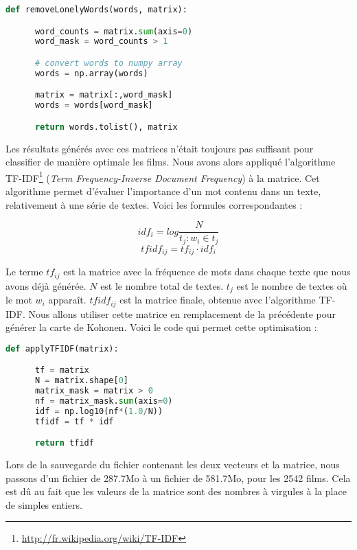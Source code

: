 \begin{lstlisting}[language=python]
  def removeLonelyWords(words, matrix):

      word_counts = matrix.sum(axis=0)
      word_mask = word_counts > 1

      # convert words to numpy array
      words = np.array(words)

      matrix = matrix[:,word_mask]
      words = words[word_mask]

      return words.tolist(), matrix
\end{lstlisting}

Les résultats générés avec ces matrices n'était toujours pas suffisant pour classifier de manière optimale les films. Nous avons alors appliqué l'algorithme TF-IDF\footnote{\url{http://fr.wikipedia.org/wiki/TF-IDF}} (\textit{Term Frequency-Inverse Document Frequency}) à la matrice. Cet algorithme permet d'évaluer l'importance d'un mot contenu dans un texte, relativement à une série de textes. Voici les formules correspondantes :

\[idf_i = log\frac{N}{t_j : w_i \in t_j}\]
\[tfidf_{ij} = tf_{ij} \cdot idf_i\]

Le terme $tf_{ij}$ est la matrice avec la fréquence de mots dans chaque texte que nous avons déjà générée. $N$ est le nombre total de textes. $t_j$ est le nombre de textes où le mot $w_i$ apparaît. $tfidf_{ij}$ est la matrice finale, obtenue avec l'algorithme TF-IDF. Nous allons utiliser cette matrice en remplacement de la précédente pour générer la carte de Kohonen. Voici le code qui permet cette optimisation : \\

\begin{lstlisting}[language=python] 
 def applyTFIDF(matrix):

      tf = matrix
      N = matrix.shape[0]
      matrix_mask = matrix > 0
      nf = matrix_mask.sum(axis=0)
      idf = np.log10(nf*(1.0/N))
      tfidf = tf * idf

      return tfidf
\end{lstlisting}

Lors de la sauvegarde du fichier contenant les deux vecteurs et la matrice, nous passons d'un fichier de 287.7Mo à un fichier de 581.7Mo, pour les 2542 films. Cela est dû au fait que les valeurs de la matrice sont des nombres à virgules à la place de simples entiers.

